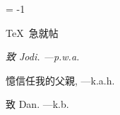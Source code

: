 %




\pageno = -1


% 
\centerline{\chapterfonts \TeX\ 急就帖}

\noheadlinetrue\pagebreak


% 
\blankpage

\blankpage


{ }
\noheadlinetrue


% 
\sinkage
{\it \flushright
   致 Jodi.
   ---{\sc p.w.a.}
   
   憶信任我的父親,
   ---{\sc k.a.h.}
   
   致 Dan.
   ---{\sc k.b.}
}
\pagebreak



\blankpage
{ }

% 
% 
\rewritetocfilefalse
%
\blankpage
{}

\shortcontents


\ifcompletebook \global\rewritetocfiletrue \fi


\contents

\blankpage
{ }

\byebye
